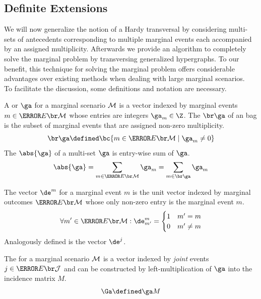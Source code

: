 \documentclass[aps, 10pt, english, twoside, pra, nofootinbib, longbibliography]{revtex4-1}
\begin{document}
    \subsection{Definite Extensions}
    We will now generalize the notion of a Hardy transversal by considering multi-sets of antecedents corresponding to multiple marginal events each accompanied by an assigned multiplicity. Afterwards we provide an algorithm to completely solve the marginal problem by transversing generalized hypergraphs. To our benefit, this technique for solving the marginal problem offers considerable advantages over existing methods when dealing with large marginal scenarios. \\

    To facilitate the discussion, some definitions and notation are necessary.
    \begin{definition}
        A  or  $\ga$ for a marginal scenario $\mathcal{M}$ is a vector indexed by marginal events $m \in \Events{\mscenario}$ whose entries are integers $\ga_{m} \in \Z$. The  $\supp{\ga}$ of an bag is the subset of marginal events that are assigned non-zero multiplicity.
        \[ \supp{\ga} \defined \bc{m \in \Events{\mscenario} \mid \ga_m \neq 0} \]
        The  $\abs{\ga}$ of a multi-set $\ga$ is entry-wise sum of $\ga$.
        \[ \abs{\ga} = \sum_{m \in \Events{\mscenario}} \ga_m = \sum_{m \in \supp{\ga}} \ga_m \]
    \end{definition}

    \begin{definition}
        The  vector $\de^{m}$ for a marginal event $m$ is the unit vector indexed by marginal outcomes $\Events{\mscenario}$ whose only non-zero entry is the marginal event $m$.
        \[ \forall m' \in \Events{\mscenario} : \de^{m}_{m'} = \begin{cases}
            1 & m' = m \\
            0 & m' \neq m
        \end{cases} \]
        Analogously defined is the  vector $\de^{j}$.
    \end{definition}

    \begin{definition}
        The  for a marginal scenario $\mathcal{M}$ is a vector indexed by \textit{joint} events $j \in \Events{\jointvar}$ and can be constructed by left-multiplication of $\ga$ into the incidence matrix $M$.
        \[ \Ga \defined \ga \tcdot M \]
    \end{definition}
\end{document}
